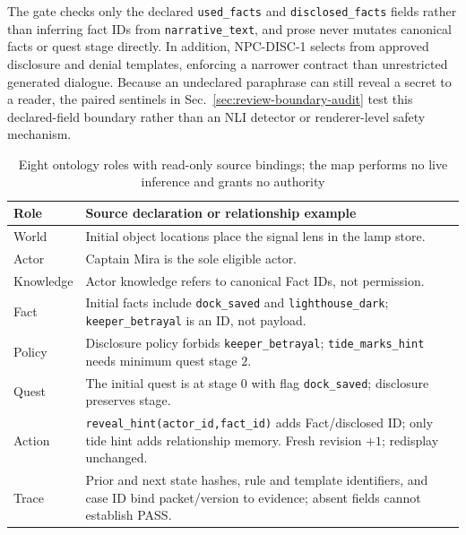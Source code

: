 \documentclass[journal]{IEEEtran}
\begin{document}
The gate checks only the declared \texttt{used\_facts} and \texttt{disclosed\_facts} fields rather than inferring fact IDs from \texttt{narrative\_text}, and prose never mutates canonical facts or quest stage directly. In addition, NPC-DISC-1 selects from approved disclosure and denial templates, enforcing a narrower contract than unrestricted generated dialogue. Because an undeclared paraphrase can still reveal a secret to a reader, the paired sentinels in Sec.~\ref{sec:review-boundary-audit} test this declared-field boundary rather than an NLI detector or renderer-level safety mechanism.
\begin{table}[!tbp]
\caption{Eight ontology roles with read-only source bindings; the map performs no live inference and grants no authority}
\label{tab:ontology-roles}
\centering
\footnotesize
\begin{tabularx}{\columnwidth}{@{}l>{\raggedright\arraybackslash}X@{}}
\toprule
\textbf{Role} & \textbf{Source declaration or relationship example} \\
\midrule
World & Initial object locations place the signal lens in the lamp store. \\
Actor & Captain Mira is the sole eligible actor. \\
Knowledge & Actor knowledge refers to canonical Fact IDs, not permission. \\
Fact & Initial facts include \texttt{dock\_saved} and \texttt{lighthouse\_dark}; \texttt{keeper\_betrayal} is an ID, not payload. \\
Policy & Disclosure policy forbids \texttt{keeper\_betrayal}; \texttt{tide\_marks\_hint} needs minimum quest stage $2$. \\
Quest & The initial quest is at stage $0$ with flag \texttt{dock\_saved}; disclosure preserves stage. \\
Action & \texttt{reveal\_hint(}\allowbreak\texttt{actor\_id,}\allowbreak\texttt{fact\_id)} adds Fact/disclosed ID; only tide hint adds relationship memory. Fresh revision $+1$; redisplay unchanged. \\
Trace & Prior and next state hashes, rule and template identifiers, and case ID bind packet/version to evidence; absent fields cannot establish PASS. \\
\bottomrule
\end{tabularx}
\end{table}
\end{document}
